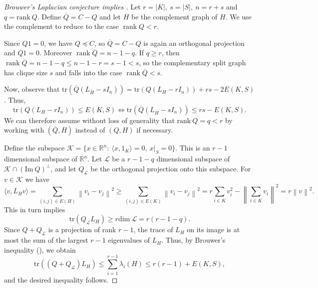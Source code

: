 \documentclass[10pt,reqno]{amsart}
\theoremstyle{definition}
\theoremstyle{remark}
\numberwithin{equation}{section}
\newcommand{\R}{\mathbb{R}}
\newcommand{\tr}{\text{tr} }
\newcommand{\norm}[1]{\left\| #1 \right\|}
\begin{document}
\begin{proof}[Brouwer's Laplacian conjecture implies ]
    Let $r=|K|,\ s=|S|,\ n=r+s$ and $q=\text{rank}\ Q$.  Define $\overline{Q}=C-Q$ and let $\overline{H}$ be the complement graph of $H$. We use the complement to reduce to the case $\operatorname{rank} Q<r$. 

    Since $Q1=0$, we have $Q\preceq  C$, so $\overline Q=C-Q$ is again an
orthogonal projection and $\overline Q1=0$. Moreover $\operatorname{rank}\overline Q=n-1-q$.
If $q\ge r$, then
$\operatorname{rank}\overline Q=n-1-q\le n-1-r=s-1<s$,
so the complementary split graph has clique size \(s\) and falls into the
case $\operatorname{rank}\overline Q<s$.



    Now, observe that $\tr \left ( \overline{Q}(L_{\overline{H}}-sI_n)\right )=\tr \left (Q(L_H-rI_n)\right )+rs-2E(K,S)$. Thus, 
    $$\tr \left (Q(L_H-rI_n)\right )\le E(K,S) \Leftrightarrow \tr \left ( \overline{Q}(L_{\overline{H}}-sI_n)\right )\le rs-E(K,S).$$
    We can therefore assume without loss of generality that $\text{rank} \ Q=q<r$ by working with $(\overline{Q},\overline{H})$ instead of  $(Q,H)$ if necessary.
    
    Define the subspace $\mathcal{K}=\{x\in \R^n: \ \langle x,1_K\rangle =0,\ x|_{S}=0\}$. This is an $r-1$ dimensional subspace of $\R^n$. Let $\mathcal{L}$ be a $r-1-q$ dimensional subspace of $\mathcal{K}\cap (\text{Im} \ Q)^{\perp}$, and let $Q_{\mathcal{L}}$ be the orthogonal projection onto this subspace. 
    For $v\in \mathcal{K}$ we have
    $$\langle v,L_Hv\rangle = \sum\limits_{(i,j)\in E(H)}\norm{v_i-v_j}^2\ge \sum\limits_{(i,j)\in E(K)}\norm{v_i-v_j}^2=r\sum\limits_{i\in K}v_i^2-\norm{\sum\limits_{i\in K}v_i}^2=r\norm{v}^2.$$
    This in turn implies $$\tr(Q_{\mathcal{L}}L_H)\ge r\text{dim}\ \mathcal{L}=r\left (r-1-q\right). $$
    Since $Q+Q_{\mathcal L}$ is a projection of rank $r-1$, the trace of $L_H$ on its image is at most the sum of the largest $r-1$ eigenvalues of $L_H$. Thus, by Brouwer's inequality (), we obtain
    $$\tr\left ((Q+Q_{\mathcal{L}})L_H\right )\le \sum\limits_{i=1}^{r-1}\lambda_i(H)\le r(r-1)+ E(K,S), $$
    and the desired inequality follows.
\end{proof}
\end{document}
